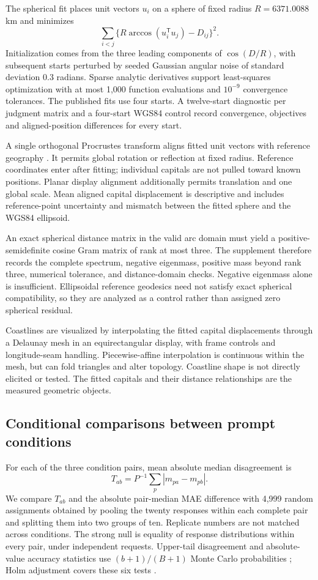 \documentclass[12pt,a4paper]{article}
\begin{document}
The spherical fit places unit vectors $u_i$ on a sphere of fixed radius $R=6371.0088$ km and minimizes
\begin{equation}
 \sum_{i<j}\{R\arccos(u_i^{\mathsf T}u_j)-D_{ij}\}^2.
\end{equation}
Initialization comes from the three leading components of $\cos(D/R)$, with subsequent starts perturbed by seeded Gaussian angular noise of standard deviation 0.3 radians. Sparse analytic derivatives support least-squares optimization with at most 1,000 function evaluations and $10^{-9}$ convergence tolerances. The published fits use four starts. A twelve-start diagnostic per judgment matrix and a four-start WGS84 control record convergence, objectives and aligned-position differences for every start.

A single orthogonal Procrustes transform aligns fitted unit vectors with reference geography \cite{schonemann}. It permits global rotation or reflection at fixed radius. Reference coordinates enter after fitting; individual capitals are not pulled toward known positions. Planar display alignment additionally permits translation and one global scale. Mean aligned capital displacement is descriptive and includes reference-point uncertainty and mismatch between the fitted sphere and the WGS84 ellipsoid.

An exact spherical distance matrix in the valid arc domain must yield a positive-semidefinite cosine Gram matrix of rank at most three. The supplement therefore records the complete spectrum, negative eigenmass, positive mass beyond rank three, numerical tolerance, and distance-domain checks. Negative eigenmass alone is insufficient. Ellipsoidal reference geodesics need not satisfy exact spherical compatibility, so they are analyzed as a control rather than assigned zero spherical residual.

Coastlines are visualized by interpolating the fitted capital displacements through a Delaunay mesh in an equirectangular display, with frame controls and longitude-seam handling. Piecewise-affine interpolation is continuous within the mesh, but can fold triangles and alter topology. Coastline shape is not directly elicited or tested. The fitted capitals and their distance relationships are the measured geometric objects.

\subsection{Conditional comparisons between prompt conditions}
For each of the three condition pairs, mean absolute median disagreement is
\begin{equation}
 T_{ab}=P^{-1}\sum_p|m_{pa}-m_{pb}|.
\end{equation}
We compare $T_{ab}$ and the absolute pair-median MAE difference with 4,999 random assignments obtained by pooling the twenty responses within each complete pair and splitting them into two groups of ten. Replicate numbers are not matched across conditions. The strong null is equality of response distributions within every pair, under independent requests. Upper-tail disagreement and absolute-value accuracy statistics use $(b+1)/(B+1)$ Monte Carlo probabilities \cite{scipyperm}; Holm adjustment covers these six tests \cite{holm}.
\end{document}
